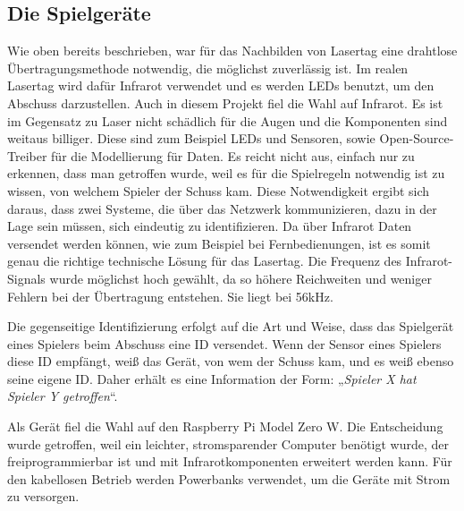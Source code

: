 \subsection{Die Spielgeräte}
\label{sec:architektur-spielgeraete}

Wie oben bereits beschrieben, war für das Nachbilden von Lasertag eine drahtlose Übertragungsmethode
notwendig, die möglichst zuverlässig ist.
Im realen Lasertag wird dafür Infrarot verwendet und es werden LEDs benutzt, um den Abschuss
darzustellen.
Auch in diesem Projekt fiel die Wahl auf Infrarot.
Es ist im Gegensatz zu Laser nicht schädlich für die Augen und die Komponenten sind weitaus billiger.
Diese sind zum Beispiel LEDs und Sensoren, sowie Open-Source-Treiber für die
Modellierung für Daten.
Es reicht nicht aus, einfach nur zu erkennen, dass man getroffen wurde, weil es für die Spielregeln
notwendig ist zu wissen, von welchem Spieler der Schuss kam.
Diese Notwendigkeit ergibt sich daraus, dass zwei Systeme, die über das Netzwerk kommunizieren, dazu
in der Lage sein müssen, sich eindeutig zu identifizieren.
Da über Infrarot Daten versendet werden können, wie zum Beispiel bei
Fernbedienungen, ist es somit genau die richtige technische Lösung für das Lasertag.
Die Frequenz des Infrarot-Signals wurde möglichst hoch gewählt, da so höhere Reichweiten und weniger Fehlern bei der Übertragung entstehen.
Sie liegt bei 56kHz.

Die gegenseitige Identifizierung erfolgt auf die Art und Weise, dass das Spielgerät eines Spielers beim Abschuss
eine ID versendet.
Wenn der Sensor eines Spielers diese ID empfängt, weiß das Gerät, von wem der Schuss kam, und es
weiß ebenso seine eigene ID.
Daher erhält es eine Information der Form: „\emph{Spieler X hat Spieler Y getroffen}“.

Als Gerät fiel die Wahl auf den Raspberry Pi Model Zero W. Die Entscheidung wurde getroffen, weil
ein leichter, stromsparender Computer benötigt wurde, der freiprogrammierbar ist und mit
Infrarotkomponenten erweitert werden kann.
Für den kabellosen Betrieb werden Powerbanks verwendet, um die Geräte mit Strom zu versorgen.
